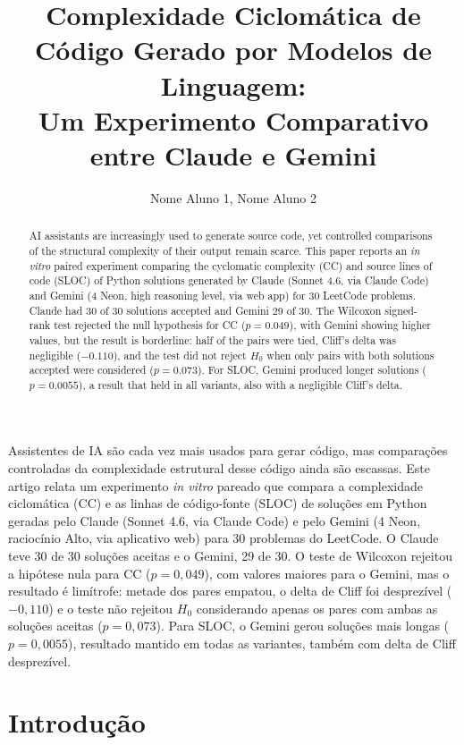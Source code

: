 \documentclass[12pt]{article}
\title{Complexidade Ciclomática de Código Gerado por Modelos de Linguagem:\\
Um Experimento Comparativo entre Claude e Gemini}
\author{Nome Aluno 1\inst{1}, Nome Aluno 2\inst{1}}
\begin{document}
\maketitle

\begin{abstract}
AI assistants are increasingly used to generate source code, yet controlled comparisons of the
structural complexity of their output remain scarce. This paper reports an \emph{in vitro}
paired experiment comparing the cyclomatic complexity (CC) and source lines of code (SLOC) of
Python solutions generated by Claude (Sonnet 4.6, via Claude Code) and Gemini (4 Neon, high
reasoning level, via web app) for 30 LeetCode problems. Claude had 30 of 30 solutions accepted
and Gemini 29 of 30. The Wilcoxon signed-rank test rejected the null hypothesis for CC
($p = 0.049$), with Gemini showing higher values, but the result is borderline: half of the pairs
were tied, Cliff's delta was negligible ($-0.110$), and the test did not reject $H_0$ when only
pairs with both solutions accepted were considered ($p = 0.073$). For SLOC, Gemini produced longer
solutions ($p = 0.0055$), a result that held in all variants, also with a negligible Cliff's delta.
\end{abstract}

\begin{resumo}
Assistentes de IA são cada vez mais usados para gerar código, mas comparações controladas da
complexidade estrutural desse código ainda são escassas. Este artigo relata um experimento
\emph{in vitro} pareado que compara a complexidade ciclomática (CC) e as linhas de código-fonte
(SLOC) de soluções em Python geradas pelo Claude (Sonnet 4.6, via Claude Code) e pelo Gemini
(4 Neon, raciocínio Alto, via aplicativo web) para 30 problemas do LeetCode. O Claude teve 30 de
30 soluções aceitas e o Gemini, 29 de 30. O teste de Wilcoxon rejeitou a hipótese nula para CC
($p = 0{,}049$), com valores maiores para o Gemini, mas o resultado é limítrofe: metade dos pares
empatou, o delta de Cliff foi desprezível ($-0{,}110$) e o teste não rejeitou $H_0$ considerando
apenas os pares com ambas as soluções aceitas ($p = 0{,}073$). Para SLOC, o Gemini gerou soluções
mais longas ($p = 0{,}0055$), resultado mantido em todas as variantes, também com delta de Cliff
desprezível.
\end{resumo}

\section{Introdução}
\end{document}
